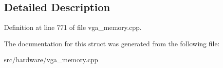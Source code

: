 \subsection{Detailed Description}


Definition at line 771 of file vga\-\_\-memory.\-cpp.



The documentation for this struct was generated from the following file\-:\begin{DoxyCompactItemize}
\item 
src/hardware/vga\-\_\-memory.\-cpp\end{DoxyCompactItemize}
